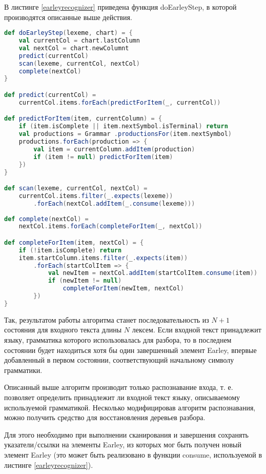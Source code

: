 В листинге \ref{earleyrecognizer} приведена функция doEarleyStep, в которой производятся описанные выше действия.

\begin{minipage}{\linewidth}
\begin{lstlisting}[caption={Псевдокод шага алгоритма Earley},language=Scala,label=earleyrecognizer]
def doEarleyStep(lexeme, chart) = {
	val currentCol = chart.lastColumn
	val nextCol = chart.newColumnt
	predict(currentCol)
	scan(lexeme, currentCol, nextCol)
	complete(nextCol)
}

def predict(currentCol) = 
	currentCol.items.forEach(predictForItem(_, currentCol))

def predictForItem(item, currentColumn) = {
	if (item.isComplete || item.nextSymbol.isTerminal) return
	val productions = Grammar .productionsFor(item.nextSymbol)
	productions.forEach(production => {
		val item = currentColumn.addItem(production)
		if (item != null) predictForItem(item)
	})
}

def scan(lexeme, currentCol, nextCol) = 
	currentCol.items.filter(_.expects(lexeme))
		.forEach(nextCol.addItem(_.consume(lexeme)))
	
def complete(nextCol) = 
	nextCol.items.forEach(completeForItem(_, nextCol))

def completeForItem(item, nextCol) = {
	if (!item.isComplete) return
	item.startColumn.items.filter(_.expects(item))
		.forEach(startColItem => {
			val newItem = nextCol.addItem(startColItem.consume(item))
			if (newItem != null)
				completeForItem(newItem, nextCol)		
		})
}
\end{lstlisting}
\end{minipage}

Так, результатом работы алгоритма станет последовательность из $N+1$ состояния для входного текста длины $N$ лексем. Если входной текст принадлежит языку, грамматика которого использовалась для разбора, то в последнем состоянии будет находиться хотя бы один завершенный элемент Earley, впервые добавленный в первом состоянии, соответствующий начальному символу грамматики.

Описанный выше алгоритм производит только распознавание входа, т. е. позволяет определить принадлежит ли входной текст языку, описываемому используемой грамматикой. Несколько модифицировав алгоритм распознавания, можно получить средство для восстановления деревьев разбора.

Для этого необходимо при выполнении сканирования и завершения сохранять указатели/ссылки на элементы Earley, из которых мог быть получен новый элемент Earley (это может быть реализовано в функции consume, используемой в листинге \ref{earleyrecognizer}). 


